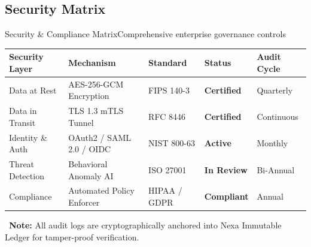 \documentclass[aspectratio=169, 10pt]{beamer}
\begin{document}
\subsection{Security Matrix}
\begin{frame}{Security \& Compliance Matrix}{Comprehensive enterprise governance controls}
  \centering
  \small
  \begin{tabular}{lllll}
    \toprule
    \textbf{Security Layer} & \textbf{Mechanism} & \textbf{Standard} & \textbf{Status} & \textbf{Audit Cycle} \\
    \midrule
    Data at Rest & AES-256-GCM Encryption & FIPS 140-3 & \textcolor{TealAccent}{\bfseries Certified} & Quarterly \\{}
    Data in Transit & TLS 1.3 mTLS Tunnel & RFC 8446 & \textcolor{TealAccent}{\bfseries Certified} & Continuous \\{}
    Identity \& Auth & OAuth2 / SAML 2.0 / OIDC & NIST 800-63 & \textcolor{TealAccent}{\bfseries Active} & Monthly \\{}
    Threat Detection & Behavioral Anomaly AI & ISO 27001 & \textcolor{RoyalAccent}{\bfseries In Review} & Bi-Annual \\{}
    Compliance & Automated Policy Enforcer & HIPAA / GDPR & \textcolor{TealAccent}{\bfseries Compliant} & Annual \\
    \bottomrule
  \end{tabular}

  \vspace*{0.2cm}
  \begin{tcolorbox}[colback=white,colframe=BorderGray,arc=3pt,left=6pt,right=6pt,top=3pt,bottom=3pt]
    \small\faInfoCircle~\textbf{Note:} All audit logs are cryptographically anchored into Nexa Immutable Ledger for tamper-proof verification.
  \end{tcolorbox}
\end{frame}

\end{document}
